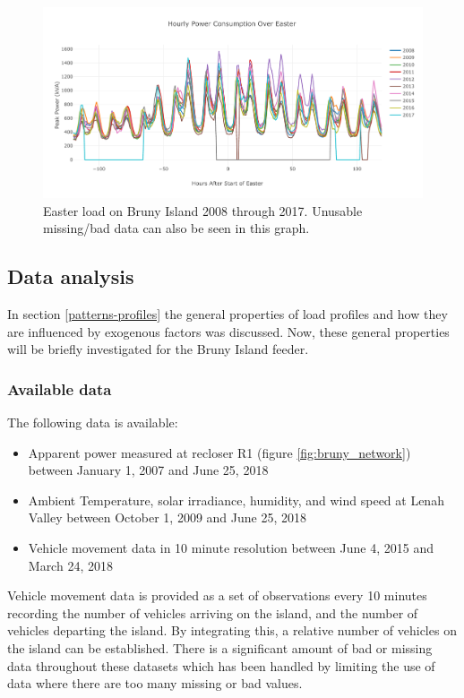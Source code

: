 \begin{figure}[htbp]
	\centerline{\includegraphics[width=.9\textwidth]{images/easter_bruny.pdf}}
	\caption{Easter load on Bruny Island 2008 through 2017.
		Unusable missing/bad data can also be seen in this graph.}
	\label{fig:bruny_easter}
\end{figure}

\subsection{Data analysis}
\label{bruny-data-analysis}

In section \ref{patterns-profiles} the general properties of load profiles and how they are influenced by exogenous factors was discussed. Now, these general properties will be briefly investigated for the Bruny Island feeder.
\subsubsection{Available data}
The following data is available:
\begin{itemize}
	\item Apparent power measured at recloser R1 (figure \ref{fig:bruny_network}) between January 1, 2007 and June 25, 2018
	\item Ambient Temperature, solar irradiance, humidity, and wind speed at Lenah Valley between October 1, 2009 and June 25, 2018
	\item Vehicle movement data in 10 minute resolution between June 4, 2015 and March 24, 2018
\end{itemize}	
Vehicle movement data is provided as a set of observations every 10 minutes recording the number of vehicles arriving on the island, and the number of vehicles departing the island.
By integrating this, a relative number of vehicles on the island can be established.
There is a significant amount of bad or missing data throughout these datasets which has been handled by limiting the use of data where there are too many missing or bad values.

